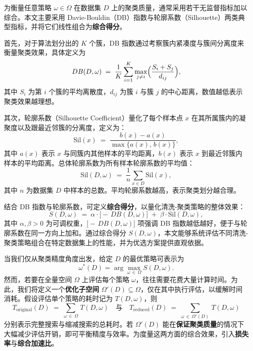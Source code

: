 \documentclass[10pt]{article} %
\numberwithin{equation}{section}
\begin{document}
为衡量任意策略 \(\omega \in \Omega\) 在数据集 \(D\) 上的聚类质量，通常采用若干无监督指标加以综合。本文主要采用 Davie-Bouldin（DB）指数与轮廓系数（Silhouette）两类典型指标，并将它们线性组合为\textbf{综合得分}。

首先，对于算法划分出的 \(K\) 个簇，DB 指数通过考察簇内紧凑度与簇间分离度来衡量聚类效果，具体定义为
\begin{equation}\label{eq:db-score}
  DB(D,\omega)
  \;=\;
  \frac{1}{K}\sum_{i=1}^{K}
  \max_{j\neq i}
  \Bigl(\frac{S_i + S_j}{d_{ij}}\Bigr),
\end{equation}
其中 \(S_i\) 为第 \(i\) 个簇的平均离散度，\(d_{ij}\) 为簇 \(i\) 与簇 \(j\) 的中心距离，数值越低表示聚类效果越理想。

其次，轮廓系数（Silhouette Coefficient）量化了每个样本点 \(x\) 在其所属簇内的凝聚度以及跟最近邻簇的分离度，定义为：
\begin{equation}\label{eq:silhouette}
  \mathrm{Sil}(x)
  \;=\;
  \frac{b(x) - a(x)}{\max\bigl\{a(x),\,b(x)\bigr\}},
\end{equation}
其中 \(a(x)\) 表示 \(x\) 与同簇内其他样本的平均距离，\(b(x)\) 表示 \(x\) 到最近邻簇内样本的平均距离。总体轮廓系数为所有样本轮廓系数的平均值：
\begin{equation}\label{eq:average-silhouette}
  \mathrm{Sil}(D,\omega)
  \;=\;
  \frac{1}{n} \sum_{x \in D} \mathrm{Sil}(x),
\end{equation}
其中 \(n\) 为数据集 \(D\) 中样本的总数。平均轮廓系数越高，表示聚类划分越合理。

结合 DB 指数与轮廓系数，可定义\textbf{综合得分}，以量化清洗-聚类策略的整体效果：
\begin{equation}\label{eq:S-score}
  S(D,\omega)
  \;=\;
  \alpha \cdot \bigl[-\,DB(D,\omega)\bigr]
  \;+\;
  \beta \cdot \mathrm{Sil}(D,\omega),
\end{equation}
其中 \(\alpha,\beta > 0\) 为可调权重，\(\bigl[-\,DB(D,\omega)\bigr]\) 项强调 DB 指数越低越好，便于与轮廓系数在同一方向上加和。通过综合得分 \(S(D,\omega)\)，本文能够系统评估不同清洗-聚类策略组合在特定数据集上的性能，并为优选方案提供直观依据。

当我们仅从聚类精度角度出发，给定 \(D\) 的最优策略可表示为
\begin{equation}\label{eq:best strategy}
  \omega^*(D)
  = \arg\max_{\omega \,\in\, \Omega} S(D,\omega).
\end{equation}
然而，若要在全量空间 \(\Omega\) 上评估每个策略 \(\omega\)，往往需要花费大量计算时间。为此，我们将定义一个\textbf{优化子空间} \(\Omega'(D)\subseteq \Omega\)，仅在其中执行评估，以缓解时间消耗。假设评估单个策略的耗时记为 \(T(D,\omega)\)，则
\begin{equation}\label{eq:T-original}
  T_{\text{original}}(D)
  \;=\;
  \sum_{\omega \,\in\, \Omega} \, T(D,\omega)
\quad\text{与}\quad
  T_{\text{reduced}}(D)
  \;=\;
  \sum_{\omega \,\in\, \Omega'(D)} \, T(D,\omega)
\end{equation}
分别表示完整搜索与缩减搜索的总耗时。若 \(\Omega'(D)\) 能在\textbf{保证聚类质量}的情况下大幅减少评估开销，即可平衡精度与效率。为度量这两方面的综合效果，引入\textbf{损失率}与\textbf{综合加速比}。
\end{document}
